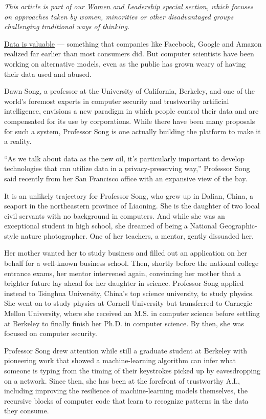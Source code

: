 \emph{This article is part of our}
\href{https://www.nytimes.com/spotlight/women-and-leadership}{\emph{Women
and Leadership special section}}\emph{, which focuses on approaches
taken by women, minorities or other disadvantaged groups challenging
traditional ways of thinking.}

\href{https://www.nytimes.com/interactive/2019/09/23/opinion/data-privacy-jaron-lanier.html}{Data
is valuable} --- something that companies like Facebook, Google and
Amazon realized far earlier than most consumers did. But computer
scientists have been working on alternative models, even as the public
has grown weary of having their data used and abused.

Dawn Song, a professor at the University of California, Berkeley, and
one of the world's foremost experts in computer security and trustworthy
artificial intelligence, envisions a new paradigm in which people
control their data and are compensated for its use by corporations.
While there have been many proposals for such a system, Professor Song
is one actually building the platform to make it a reality.

``As we talk about data as the new oil, it's particularly important to
develop technologies that can utilize data in a privacy-preserving
way,'' Professor Song said recently from her San Francisco office with
an expansive view of the bay.

It is an unlikely trajectory for Professor Song, who grew up in Dalian,
China, a seaport in the northeastern province of Liaoning. She is the
daughter of two local civil servants with no background in computers.
And while she was an exceptional student in high school, she dreamed of
being a National Geographic-style nature photographer. One of her
teachers, a mentor, gently dissuaded her.

Her mother wanted her to study business and filled out an application on
her behalf for a well-known business school. Then, shortly before the
national college entrance exams, her mentor intervened again, convincing
her mother that a brighter future lay ahead for her daughter in science.
Professor Song applied instead to Tsinghua University, China's top
science university, to study physics. She went on to study physics at
Cornell University but transferred to Carnegie Mellon University, where
she received an M.S. in computer science before settling at Berkeley to
finally finish her Ph.D. in computer science. By then, she was focused
on computer security.

Professor Song drew attention while still a graduate student at Berkeley
with pioneering work that showed a machine-learning algorithm can infer
what someone is typing from the timing of their keystrokes picked up by
eavesdropping on a network. Since then, she has been at the forefront of
trustworthy A.I., including improving the resilience of machine-learning
models themselves, the recursive blocks of computer code that learn to
recognize patterns in the data they consume.

